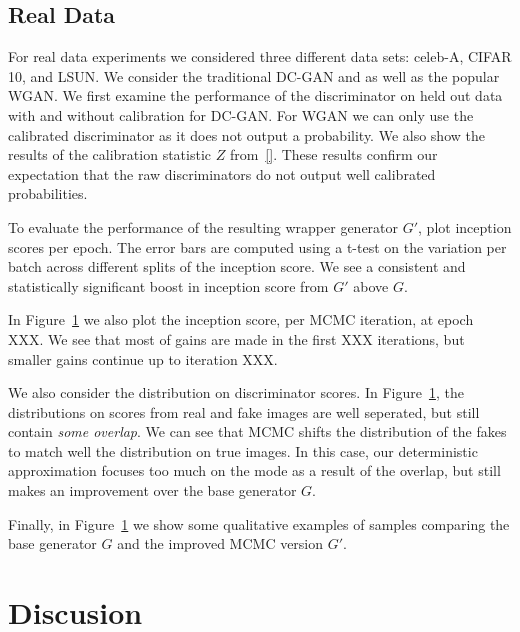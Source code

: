 \documentclass{article}
\begin{document}
\subsection{Real Data}
For real data experiments we considered three different data sets: celeb-A, CIFAR 10, and LSUN\@.
We consider the traditional DC-GAN and as well as the popular WGAN\@.  %
We first examine the performance of the discriminator on held out data with and without calibration for DC-GAN\@.
For WGAN we can only use the calibrated discriminator as it does not output a probability.
We also show the results of the calibration statistic $Z$ from~\eqref{}.
These results confirm our expectation that the raw discriminators do not output well calibrated probabilities.

To evaluate the performance of the resulting wrapper generator $G'$, plot inception scores per epoch.
The error bars are computed using a t-test on the variation per batch across different splits of the inception score.
We see a consistent and statistically significant boost in inception score from $G'$ above $G$.

In Figure~\ref{} we also plot the inception score, per MCMC iteration, at epoch XXX.  %
We see that most of gains are made in the first XXX iterations, but smaller gains continue up to iteration XXX.  %

We also consider the distribution on discriminator scores.
In Figure~\ref{}, the distributions on scores from real and fake images are well seperated, but still contain \emph{some overlap}.
We can see that MCMC shifts the distribution of the fakes to match well the distribution on true images.
In this case, our deterministic approximation focuses too much on the mode as a result of the overlap, but still makes an improvement over the base generator $G$.

Finally, in Figure~\ref{} we show some qualitative examples of samples comparing the base generator $G$ and the improved MCMC version $G'$.

\section{Discusion}
\end{document}
